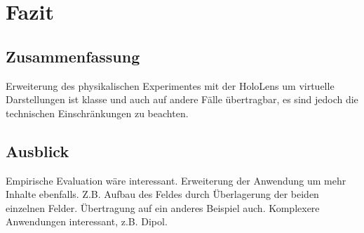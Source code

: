 \section{Fazit}
\label{sec-7}

\subsection{Zusammenfassung}
Erweiterung des physikalischen Experimentes mit der HoloLens um virtuelle Darstellungen ist klasse und auch auf andere Fälle übertragbar, es sind jedoch die technischen Einschränkungen zu beachten.

\subsection{Ausblick}
Empirische Evaluation wäre interessant. Erweiterung der Anwendung um mehr Inhalte ebenfalls. Z.B. Aufbau des Feldes durch Überlagerung der beiden einzelnen Felder. Übertragung auf ein anderes Beispiel auch. Komplexere Anwendungen interessant, z.B. Dipol.